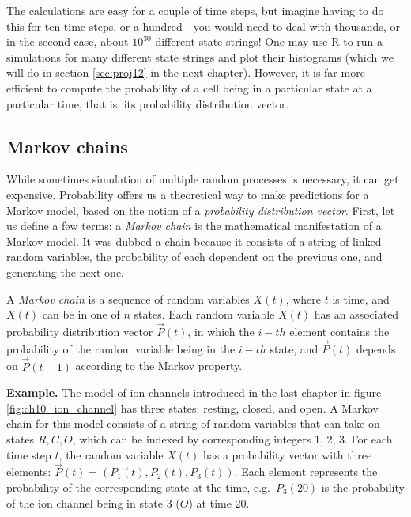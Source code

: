 \documentclass[
  letterpaper,
  DIV=11,
  numbers=noendperiod]{scrreprt}
\begin{document}
The calculations are easy for a couple of time steps, but imagine having
to do this for ten time steps, or a hundred - you would need to deal
with thousands, or in the second case, about \(10^{30}\) different state
strings! One may use R to run a simulations for many different state
strings and plot their histograms (which we will do in section
\ref{sec:proj12} in the next chapter). However, it is far more efficient
to compute the probability of a cell being in a particular state at a
particular time, that is, its probability distribution vector.

\hypertarget{markov-chains}{%
\subsection{Markov chains}\label{markov-chains}}

While sometimes simulation of multiple random processes is necessary, it
can get expensive. Probability offers us a theoretical way to make
predictions for a Markov model, based on the notion of a
\emph{probability distribution vector}. First, let us define a few
terms: a \emph{Markov chain} is the mathematical manifestation of a
Markov model. It was dubbed a chain because it consists of a string of
linked random variables, the probability of each dependent on the
previous one, and generating the next one.

\begin{tcolorbox}[enhanced jigsaw, coltitle=black, arc=.35mm, opacitybacktitle=0.6, breakable, bottomtitle=1mm, toptitle=1mm, titlerule=0mm, colback=white, leftrule=.75mm, rightrule=.15mm, colframe=quarto-callout-note-color-frame, colbacktitle=quarto-callout-note-color!10!white, opacityback=0, title=\textcolor{quarto-callout-note-color}{\faInfo}\hspace{0.5em}{Definition}, left=2mm, toprule=.15mm, bottomrule=.15mm]

A \emph{Markov chain} is a sequence of random variables \(X(t)\), where
\(t\) is time, and \(X(t)\) can be in one of \(n\) states. Each random
variable \(X(t)\) has an associated probability distribution vector
\(\vec P(t)\), in which the \(i-th\) element contains the probability of
the random variable being in the \(i-th\) state, and \(\vec P(t)\)
depends on \(\vec P(t-1)\) according to the Markov property.

\end{tcolorbox}

\textbf{Example.} The model of ion channels introduced in the last
chapter in figure \ref{fig:ch10_ion_channel} has three states: resting,
closed, and open. A Markov chain for this model consists of a string of
random variables that can take on states \(R, C, O\), which can be
indexed by corresponding integers 1, 2, 3. For each time step \(t\), the
random variable \(X(t)\) has a probability vector with three elements:
\(\vec P(t) = (P_1(t), P_2(t), P_3(t))\). Each element represents the
probability of the corresponding state at the time, e.g.~\(P_3(20)\) is
the probability of the ion channel being in state 3 (\(O\)) at time 20.
\end{document}
